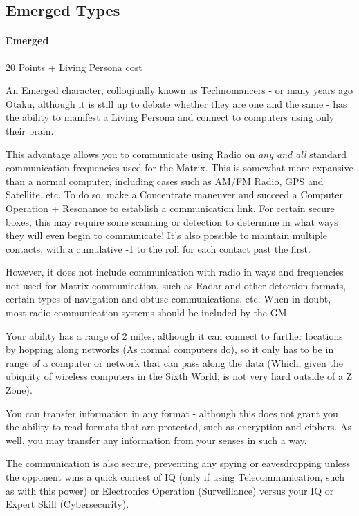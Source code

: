 \begin{multicols*}{3}
	
	\subsection{Emerged Types}
	
	\paragraph{Emerged}
	\begin{flushright}
		20 Points + Living Persona cost
	\end{flushright}
	
	An Emerged character, colloqiually known as Technomancers - or many years ago Otaku, although it is still up to debate whether they are one and the same - has the ability to manifest a Living Persona and connect to computers using only their brain.
	
	This advantage allows you to communicate using Radio on \textit{any and all} standard communication frequencies used for the Matrix. This is somewhat more expansive than a normal computer, including cases such as AM/FM Radio, GPS and Satellite, etc. To do so, make a Concentrate maneuver and succeed a Computer Operation + Resonance  to establish a communication link. For certain secure boxes, this may require some scanning or detection to determine in what ways they will even begin to communicate! It's also possible to maintain multiple contacts, with a cumulative -1 to the roll for each contact past the first.
	
	However, it does not include communication with radio in ways and frequencies not used for Matrix communication, such as Radar and other detection formats, certain types of navigation and obtuse communications, etc. When in doubt, most radio communication systems should be included by the GM.
	
	Your ability has a range of 2 miles, although it can connect to further locations by hopping along networks (As normal computers do), so it only has to be in range of a computer or network that can pass along the data (Which, given the ubiquity of wireless computers in the Sixth World, is not very hard outside of a Z Zone).
	
	You can transfer information in any format - although this does not grant you the ability to read formats that are protected, such as encryption and ciphers. As well, you may transfer any information from your senses in such a way.
	
	The communication is also secure, preventing any spying or eavesdropping unless the opponent wins a quick contest of IQ (only if using Telecommunication, such as with this power) or Electronics Operation (Surveillance) versus your IQ or Expert Skill (Cybersecurity).
	

\end{multicols*}
